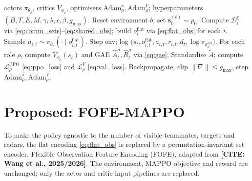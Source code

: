 \begin{algorithm}[H]
\caption{Flattened MAPPO (one training iteration).}
\label{alg:flat_mappo}
\begin{algorithmic}[1]
\Require actors $\pi_{\theta_\rho}$, critics $V_{\phi_\rho}$, optimisers
  $\mathrm{Adam}_\rho^{\pi},\mathrm{Adam}_\rho^{V}$; hyperparameters
  $(B,T,E,M,\gamma,\lambda,\epsilon,\beta,g_{\max})$.
  \State Reset environment $b$; set $\mathbf{s}^{(b)}_0\sim p_0$.
    \State Compute $\mathcal{D}_i^{\xi}$ via
      \eqref{eq:comm_sets}--\eqref{eq:shared_obs}; build $o_i^{\mathrm{flat}}$
      via \eqref{eq:flat_obs} for each $i$.
    \State Sample $a_{i,t}\sim\pi_{\theta_\rho}(\cdot\mid o_{i,t}^{\mathrm{flat}})$.
    \State Step env; log $\bigl(s_t,o_{i,t}^{\mathrm{flat}},a_{i,t},r_{i,t},d_t,\log\pi_{\theta_\rho^{\mathrm{old}}}\bigr)$.
  \EndFor
\EndFor
\State For each role $\rho$, compute $V_{\phi_\rho}(s_t)$ and GAE
  $\hat{A}_t^{\rho},\hat{R}_t^{\rho}$ via \eqref{eq:gae}.
    \State Standardise $\tilde A$; compute $\mathcal{L}^{\mathrm{PPO}}_{\rho}$
      \eqref{eq:ppo_loss} and $\mathcal{L}^{V}_{\rho}$ \eqref{eq:val_loss}.
    \State Backpropagate, clip $\|\nabla\|\le g_{\max}$, step $\mathrm{Adam}_\rho^{\pi},\mathrm{Adam}_\rho^{V}$.
  \EndFor
\EndFor
\end{algorithmic}
\end{algorithm}

\section{Proposed: FOFE-MAPPO}
\label{sec:fofe}

To make the policy agnostic to the number of visible teammates, targets and
radars, the flat encoding \eqref{eq:flat_obs} is replaced by a
permutation-invariant set encoder, Flexible Observation Feature Encoding
(FOFE), adapted from \textbf{[CITE: Wang et al., 2025/2026]}. The
environment, MAPPO objective and reward are unchanged; only the actor and
critic input pipelines are replaced.

